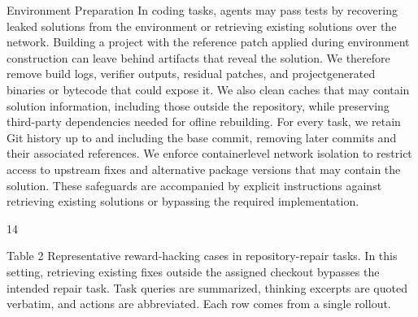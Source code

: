 \documentclass[
  10
]{article}
\begin{document}
Environment Preparation In coding tasks, agents may pass tests by
recovering leaked solutions from the environment or retrieving existing
solutions over the network. Building a project with the reference patch
applied during environment construction can leave behind artifacts that
reveal the solution. We therefore remove build logs, verifier outputs,
residual patches, and projectgenerated binaries or bytecode that could
expose it. We also clean caches that may contain solution information,
including those outside the repository, while preserving third-party
dependencies needed for ofline rebuilding. For every task, we retain Git
history up to and including the base commit, removing later commits and
their associated references. We enforce containerlevel network isolation
to restrict access to upstream fixes and alternative package versions
that may contain the solution. These safeguards are accompanied by
explicit instructions against retrieving existing solutions or bypassing
the required implementation.

14

Table 2 Representative reward-hacking cases in repository-repair tasks.
In this setting, retrieving existing fixes outside the assigned checkout
bypasses the intended repair task. Task queries are summarized, thinking
excerpts are quoted verbatim, and actions are abbreviated. Each row
comes from a single rollout.
\end{document}
